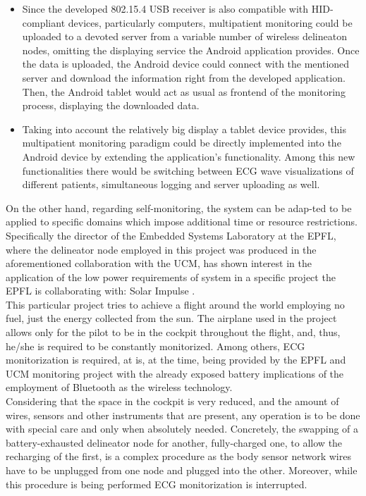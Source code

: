 \begin{itemize}
				\begin{itemize}
					\item Since the developed 802.15.4 USB receiver is also compatible with HID-compliant
						devices, particularly computers, multipatient monitoring could be uploaded to a
						devoted server from a variable number of wireless delineaton nodes, omitting the 
						displaying service the Android application provides. Once the data is uploaded,
						the Android device could connect with the mentioned server and download the information
						right from the developed application. Then, the Android tablet would act as usual
						as frontend of the monitoring process, displaying the downloaded data.

					\item Taking into account the relatively big display a tablet device provides, this
						multipatient monitoring paradigm could be directly implemented into the Android 
						device by extending the application's functionality. Among this new functionalities
						there would be switching between ECG wave visualizations of different patients,
						simultaneous logging and server uploading as well.
				\end{itemize}

				On the other hand, regarding self-monitoring, the system can be adap-ted to be applied to 
				specific domains which impose additional time or resource restrictions.
				Specifically the director of the Embedded Systems Laboratory at the EPFL, where the delineator 
				node employed in this project was produced in the aforementioned collaboration with the UCM, 
				has shown interest in the application of the low power requirements of system in a specific project
				the EPFL is collaborating with: Solar Impulse \cite{solarflight}.\\

				This particular project tries to achieve a flight around the world employing no fuel, just the
				energy collected from the sun. The airplane used in the project allows only for the pilot to be
				in the cockpit throughout the flight, and, thus, he/she is required to be constantly monitorized.
				Among others, ECG monitorization is required, at is, at the time, being provided by the EPFL and
				UCM monitoring project with the already exposed battery implications of the employment of 
				Bluetooth as the wireless technology.\\

				Considering that the space in the cockpit is very reduced, and the amount of wires, sensors and
				other instruments that are present, any operation is to be done with special care and only when
				absolutely needed. Concretely, the swapping of a battery-exhausted delineator node for another,
				fully-charged one, to allow the recharging of the first, is a complex procedure as the body
				sensor network wires have to be unplugged from one node and plugged into the other. Moreover,
				while this procedure is being performed ECG monitorization is interrupted.\\


\end{itemize}
